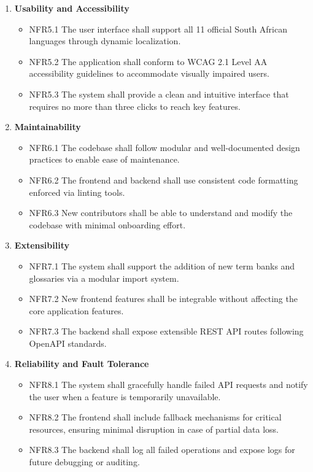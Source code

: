 \documentclass[12pt]{article}
\begin{document}
\begin{enumerate}[label=NFR\arabic*:, leftmargin=2.5em]
    \item \textbf{Usability and Accessibility}
    \begin{itemize}
        \item NFR5.1 The user interface shall support all 11 official South African languages through dynamic localization.
        \item NFR5.2 The application shall conform to WCAG 2.1 Level AA accessibility guidelines to accommodate visually impaired users.
        \item NFR5.3 The system shall provide a clean and intuitive interface that requires no more than three clicks to reach key features.
    \end{itemize}
    
    \item \textbf{Maintainability}
    \begin{itemize}
        \item NFR6.1 The codebase shall follow modular and well-documented design practices to enable ease of maintenance.
        \item NFR6.2 The frontend and backend shall use consistent code formatting enforced via linting tools.
        \item NFR6.3 New contributors shall be able to understand and modify the codebase with minimal onboarding effort.
    \end{itemize}
    
    \item \textbf{Extensibility}
    \begin{itemize}
        \item NFR7.1 The system shall support the addition of new term banks and glossaries via a modular import system.
        \item NFR7.2 New frontend features shall be integrable without affecting the core application features.
        \item NFR7.3 The backend shall expose extensible REST API routes following OpenAPI standards.
    \end{itemize}
    
    \item \textbf{Reliability and Fault Tolerance}
    \begin{itemize}
        \item NFR8.1 The system shall gracefully handle failed API requests and notify the user when a feature is temporarily unavailable.
        \item NFR8.2 The frontend shall include fallback mechanisms for critical resources, ensuring minimal disruption in case of partial data loss.
        \item NFR8.3 The backend shall log all failed operations and expose logs for future debugging or auditing.
    \end{itemize}
    

\end{enumerate}
\end{document}
